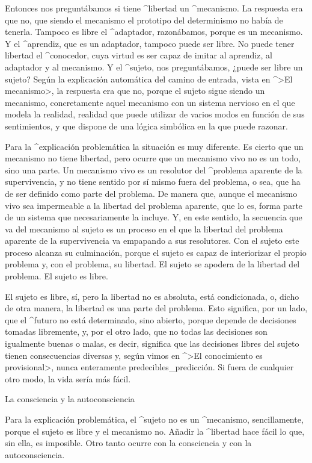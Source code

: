 Entonces nos preguntábamos si tiene ^{libertad} un ^{mecanismo}. La
respuesta era que no, que siendo el mecanismo el prototipo del
determinismo no había de tenerla. Tampoco es libre el ^{adaptador},
razonábamos, porque es un mecanismo. Y el ^{aprendiz}, que es un
adaptador, tampoco puede ser libre. No puede tener libertad el
^{conocedor}, cuya virtud es ser capaz de imitar al aprendiz, al
adaptador y al mecanismo. Y el ^{sujeto}, nos preguntábamos, ¿puede ser
libre un sujeto? Según la explicación automática del camino de entrada,
vista en ^>El mecanismo>, la respuesta era que no, porque el sujeto
sigue siendo un mecanismo, concretamente aquel mecanismo con un sistema
nervioso en el que modela la realidad, realidad que puede utilizar de
varios modos en función de sus sentimientos, y que dispone de una lógica
simbólica en la que puede razonar.

Para la ^{explicación problemática} la situación es muy diferente. Es
cierto que un mecanismo no tiene libertad, pero ocurre que un mecanismo
vivo no es un todo, sino una parte. Un mecanismo vivo es un resolutor
del ^{problema aparente} de la supervivencia, y no tiene sentido por sí
mismo fuera del problema, o sea, que ha de ser definido como parte del
problema. De manera que, aunque el mecanismo vivo sea impermeable a la
libertad del problema aparente, que lo es, forma parte de un sistema que
necesariamente la incluye. Y, en este sentido, la secuencia que va del
mecanismo al sujeto es un proceso en el que la libertad del problema
aparente de la supervivencia va empapando a sus resolutores. Con el
sujeto este proceso alcanza su culminación, porque el sujeto es capaz de
interiorizar el propio problema y, con el problema, su libertad. El
sujeto se apodera de la libertad del problema. El sujeto es libre.

El sujeto es libre, sí, pero la libertad no es absoluta, está
condicionada, o, dicho de otra manera, la libertad es una parte del
problema. Esto significa, por un lado, que el ^{futuro} no está
determinado, sino abierto, porque depende de decisiones tomadas
libremente, y, por el otro lado, que no todas las decisiones son
igualmente buenas o malas, es decir, significa que las decisiones libres
del sujeto tienen consecuencias diversas y, según vimos en ^>El
conocimiento es provisional>, nunca enteramente
predecibles_{predicción}. Si fuera de cualquier otro modo, la vida sería
más fácil.


\Section La consciencia y la autoconsciencia

Para la explicación problemática, el ^{sujeto} no es un ^{mecanismo},
sencillamente, porque el sujeto es libre y el mecanismo no. Añadir la
^{libertad} hace fácil lo que, sin ella, es imposible. Otro tanto ocurre
con la consciencia y con la autoconsciencia.

